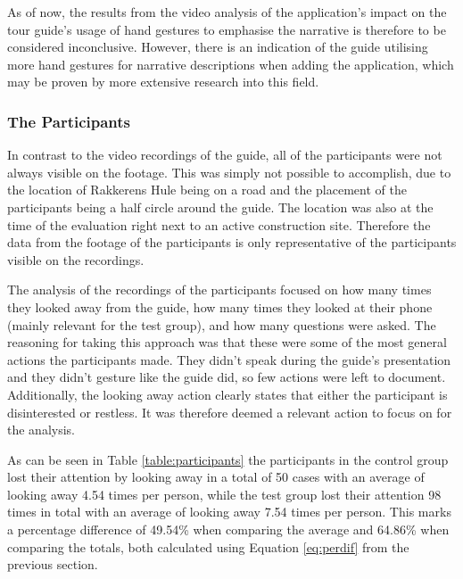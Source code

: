 As of now, the results from the video analysis of the application’s impact on the tour guide’s usage of hand gestures to emphasise the narrative is therefore to be considered inconclusive. However, there is an indication of the guide utilising more hand gestures for narrative descriptions when adding the application, which may be proven by more extensive research into this field.

\subsubsection{The Participants}
In contrast to the video recordings of the guide, all of the participants were not always visible on the footage. This was simply not possible to accomplish, due to the location of Rakkerens Hule being on a road and the placement of the participants being a half circle around the guide. The location was also at the time of the evaluation right next to an active construction site. Therefore the data from the footage of the participants is only representative of the participants visible on the recordings. 

The analysis of the recordings of the participants focused on how many times they looked away from the guide, how many times they looked at their phone (mainly relevant for the test group), and how many questions were asked. The reasoning for taking this approach was that these were some of the most general actions the participants made. They didn’t speak during the guide’s presentation and they didn’t gesture like the guide did, so few actions were left to document. Additionally, the looking away action clearly states that either the participant is disinterested or restless. It was therefore deemed a relevant action to focus on for the analysis.

As can be seen in Table \ref{table:participants} the participants in the control group lost their attention by looking away in a total of 50 cases with an average of looking away 4.54 times per person, while the test group lost their attention 98 times in total with an average of looking away 7.54 times per person. This marks a percentage difference of 49.54\% when comparing the average and 64.86\% when comparing the totals, both calculated using Equation \ref{eq:perdif} from the previous section.

